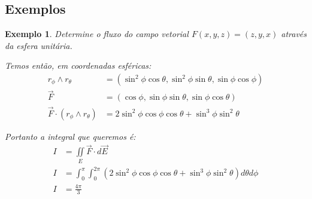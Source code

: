 \documentclass{article}
\newcommand{\doubleint}[2] {\iint\limits_{#1} #2}
\newtheorem{example}{Exemplo}[section]
\begin{document}
        \subsection{Exemplos}
            \begin{example}
                Determine o fluxo do campo vetorial $F(x,y,z) = (z, y, x)$ através da esfera unitária.

                Temos então, em coordenadas esféricas:
                \begin{align*}
                    r_\phi \wedge r_\theta &= (\sin^2\phi \cos\theta, \sin^2\phi \sin\theta, \sin\phi \cos\phi)\\
                    \vec{F} &= (\cos\phi, \sin\phi \sin\theta, \sin\phi \cos\theta)\\
                    \vec{F} \cdot (r_\phi \wedge r_\theta) &= 2\sin^2\phi \cos\phi \cos\theta + \sin^3\phi \sin^2\theta
                \end{align*}

                Portanto a integral que queremos é:
                \begin{align*}
                    I &= \doubleint{E}{\vec{F} \cdot d\vec{E}}\\
                    I &= \int_0^{\pi} \int_0^{2\pi} (2\sin^2\phi \cos\phi \cos\theta + \sin^3\phi \sin^2\theta) d\theta d\phi\\
                    I &= \frac{4\pi}{3}
                \end{align*}
            \end{example}
\end{document}
